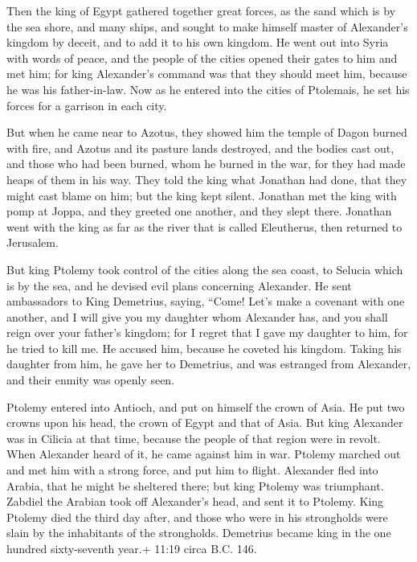  Then the king of Egypt gathered together great forces, as
the sand which is by the sea shore, and many ships, and sought to make
himself master of Alexander's kingdom by deceit, and to add it to his
own kingdom.  He went out into Syria with words of peace,
and the people of the cities opened their gates to him and met him; for
king Alexander's command was that they should meet him, because he was
his father-in-law.  Now as he entered into the cities of
Ptolemais, he set his forces for a garrison in each city.

 But when he came near to Azotus, they showed him the temple
of Dagon burned with fire, and Azotus and its pasture lands destroyed,
and the bodies cast out, and those who had been burned, whom he burned
in the war, for they had made heaps of them in his way. 
They told the king what Jonathan had done, that they might cast blame on
him; but the king kept silent.  Jonathan met the king with
pomp at Joppa, and they greeted one another, and they slept there.
 Jonathan went with the king as far as the river that is
called Eleutherus, then returned to Jerusalem.

 But king Ptolemy took control of the cities along the sea
coast, to Selucia which is by the sea, and he devised evil plans
concerning Alexander.  He sent ambassadors to King
Demetrius, saying, ``Come! Let's make a covenant with one another, and I
will give you my daughter whom Alexander has, and you shall reign over
your father's kingdom;  for I regret that I gave my
daughter to him, for he tried to kill me.  He accused him,
because he coveted his kingdom.  Taking his daughter from
him, he gave her to Demetrius, and was estranged from Alexander, and
their enmity was openly seen.

 Ptolemy entered into Antioch, and put on himself the crown
of Asia. He put two crowns upon his head, the crown of Egypt and that of
Asia.  But king Alexander was in Cilicia at that time,
because the people of that region were in revolt.  When
Alexander heard of it, he came against him in war. Ptolemy marched out
and met him with a strong force, and put him to flight. 
Alexander fled into Arabia, that he might be sheltered there; but king
Ptolemy was triumphant.  Zabdiel the Arabian took off
Alexander's head, and sent it to Ptolemy.  King Ptolemy
died the third day after, and those who were in his strongholds were
slain by the inhabitants of the strongholds.  Demetrius
became king in the one hundred sixty-seventh year.+ 11:19 circa B.C.
146.

